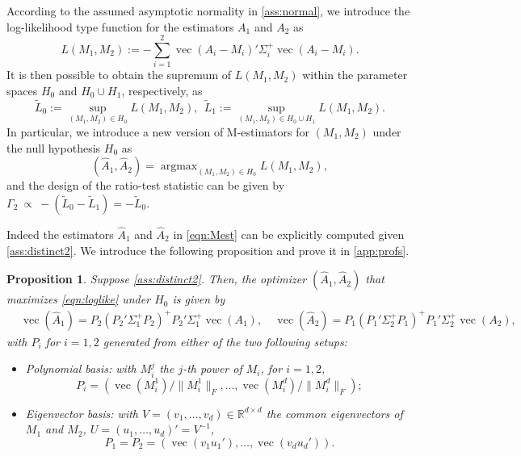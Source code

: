 \documentclass[12pt]{article}
\numberwithin{equation}{section}
\numberwithin{table}{section}
\numberwithin{thm}{section}
\numberwithin{defn}{section}
\numberwithin{lem}{section}
\newtheorem{prop}{Proposition}
\numberwithin{prop}{section}
\numberwithin{cor}{section}
\numberwithin{rem}{section}
\DeclareMathOperator*{\argmax}{arg max}
\DeclareMathOperator{\Vector}{vec}
\begin{document}
\begin{appendix}
According to the assumed asymptotic normality in \autoref{ass:normal}, we introduce the log-likelihood type function for the estimators $A_1$ and $A_2$ as
\begin{equation}\label{eqn:loglike}
    L(M_1, M_2) := - \sum_{i = 1}^2 \Vector(A_i - M_i)' \Sigma_i^+ \Vector(A_i - M_i).
\end{equation}
It is then possible to obtain the supremum of $L(M_1, M_2)$ within the parameter spaces $H_0$ and $H_0 \cup H_1$, respectively, as
\begin{equation}\label{eqn:llrMLE}
    \widetilde{L}_0 := \sup_{(M_1, M_2) \in H_0} L(M_1, M_2), ~ ~ \widetilde{L}_1 := \sup_{(M_1, M_2) \in H_0 \cup H_1} L(M_1, M_2).
\end{equation}
In particular, we introduce a new version of M-estimators for $(M_1, M_2)$ under the null hypothesis $H_0$ as
\begin{equation}
    (\widehat{A}_1, \widehat{A}_2) = \argmax_{(M_1, M_2) \in H_0} L(M_1, M_2),\label{eqn:Mest}
\end{equation}
and the design of the ratio-test statistic can be given by
$
\Gamma_2 ~ \propto ~ - (\widetilde{L}_0 - \widetilde{L}_1) = - \widetilde{L}_0.
$

Indeed the estimators $\widehat{A}_1$ and $\widehat{A}_2$ in \eqref{eqn:Mest} can be explicitly computed given \autoref{ass:distinct2}. We introduce the following proposition and prove it in \autoref{app:profs}.

\begin{prop}\label{thm:ahat}
Suppose \autoref{ass:distinct2}.
Then, the optimizer $(\widehat{A}_1,\widehat{A}_2)$ that maximizes \eqref{eqn:loglike} under $H_0$ is given by
\begin{equation}\label{eqn:Ahat}
    \begin{aligned}
        & \Vector(\widehat{A}_1) = P_2 (P_2' \Sigma_1^+ P_2)^+ P_2' \Sigma_1^+ \Vector(A_1),\
        & \Vector(\widehat{A}_2) = P_1 (P_1' \Sigma_2^+ P_1)^+ P_1' \Sigma_2^+ \Vector(A_2),
    \end{aligned}
\end{equation}
with $P_i$ for $i = 1, 2$ generated from either of the two following setups:\begin{itemize}
    \item Polynomial basis: with $M_i^j$ the $j$-th power of $M_i$, for $i = 1, 2$,
    \begin{equation}\label{eqn:polyP}
        P_i = (\Vector(M_i^1)/\|M_i^1\|_F, \dots, \Vector(M_i^{d})/\|M_i^d\|_F);
    \end{equation}
    \item Eigenvector basis: with $V = (v_1, \dots, v_d) \in \mathbb{R}^{d \times d}$ the common eigenvectors of $M_1$ and $M_2$, $U = (u_1, \dots, u_d)' = V^{-1}$,
    \begin{equation}\label{eqn:eigvP}
        P_1 = P_2 = (\Vector(v_1 u_1'), \dots, \Vector(v_d u_d')).
    \end{equation}
\end{itemize}
\end{prop}


\end{appendix}
\end{document}
